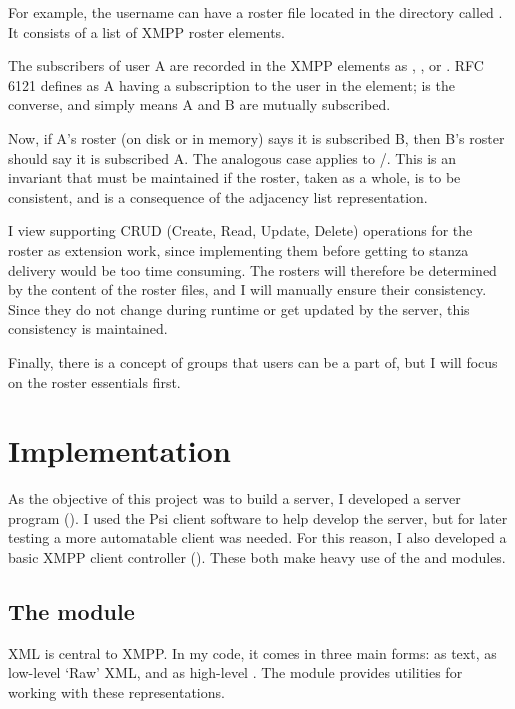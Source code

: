 \documentclass[12pt,a4paper,twoside,openright]{report}
\begin{document}
{For example, the username  can have a roster file located in the  directory called . It consists of a list of XMPP roster  elements.

The subscribers of user A are recorded in the XMPP  elements as , , or . RFC 6121 defines  as A having a subscription to the user in the  element;  is the converse, and  simply means A and B are mutually subscribed.

Now, if A's roster (on disk or in memory) says it is subscribed  B, then B's roster should say it is subscribed  A. The analogous case applies to /. This is an invariant that must be maintained if the roster, taken as a whole, is to be consistent, and is a consequence of the adjacency list representation.

I view supporting CRUD (Create, Read, Update, Delete) operations for the roster as extension work, since implementing them before getting to stanza delivery would be too time consuming. The rosters will therefore be determined by the content of the roster files, and I will manually ensure their consistency. Since they do not change during runtime or get updated by the server, this consistency is maintained.

Finally, there is a concept of groups that users can be a part of, but I will focus on the roster essentials first.


\chapter{Implementation}
As the objective of this project was to build a server, I developed a server program (). I used the Psi client software to help develop the server, but for later testing a more automatable client was needed. For this reason, I also developed a basic XMPP client controller ().
These both make heavy use of the  and  modules.

\section{The  module}\label{sec:xmlmod}
XML is central to XMPP. In my code, it comes in three main forms: as text, as low-level `Raw' XML, and as high-level . The  module provides utilities for working with these representations.

}
\end{document}
